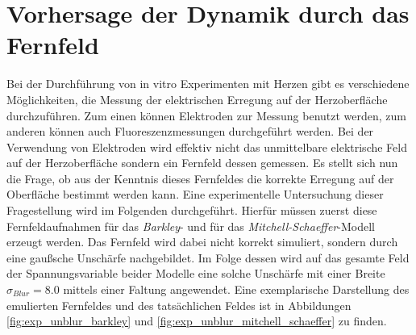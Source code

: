 \clearpage
\section{Vorhersage der Dynamik durch das Fernfeld}
\label{sec:exp_unblur}
Bei der Durchführung von in vitro Experimenten mit Herzen gibt es verschiedene Möglichkeiten, die Messung der elektrischen Erregung auf der Herzoberfläche durchzuführen. Zum einen können Elektroden zur Messung benutzt werden, zum anderen können auch Fluoreszenzmessungen durchgeführt werden. Bei der Verwendung von Elektroden wird effektiv nicht das unmittelbare elektrische Feld auf der Herzoberfläche sondern ein Fernfeld dessen gemessen. Es stellt sich nun die Frage, ob aus der Kenntnis dieses Fernfeldes die korrekte Erregung auf der Oberfläche bestimmt werden kann. Eine experimentelle Untersuchung dieser Fragestellung wird im Folgenden durchgeführt. Hierfür müssen zuerst diese Fernfeldaufnahmen für das \textit{Barkley}- und für das \textit{Mitchell-Schaeffer}-Modell erzeugt werden. Das Fernfeld wird dabei nicht korrekt simuliert, sondern durch eine gaußsche Unschärfe nachgebildet. Im Folge dessen wird auf das gesamte Feld der Spannungsvariable beider Modelle eine solche Unschärfe mit einer Breite $\sigma_{Blur} = 8.0$ mittels einer Faltung angewendet. Eine exemplarische Darstellung des emulierten Fernfeldes und des tatsächlichen Feldes ist in Abbildungen \ref{fig:exp_unblur_barkley} und \ref{fig:exp_unblur_mitchell_schaeffer} zu finden.


